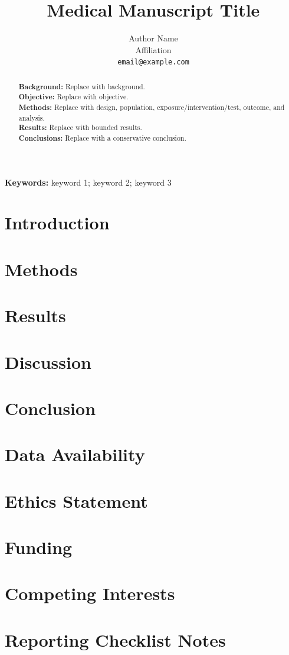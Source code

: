 \documentclass[11pt]{article}
\title{Medical Manuscript Title}
\author{Author Name\\Affiliation\\\texttt{email@example.com}}
\date{}
\begin{document}
\maketitle

\begin{abstract}
\textbf{Background:} Replace with background.\\
\textbf{Objective:} Replace with objective.\\
\textbf{Methods:} Replace with design, population, exposure/intervention/test, outcome, and analysis.\\
\textbf{Results:} Replace with bounded results.\\
\textbf{Conclusions:} Replace with a conservative conclusion.
\end{abstract}

\noindent\textbf{Keywords:} keyword 1; keyword 2; keyword 3

\section{Introduction}

\section{Methods}

\section{Results}

\section{Discussion}

\section{Conclusion}

\section*{Data Availability}

\section*{Ethics Statement}

\section*{Funding}

\section*{Competing Interests}




\clearpage
\appendix
\section{Reporting Checklist Notes}
\end{document}
